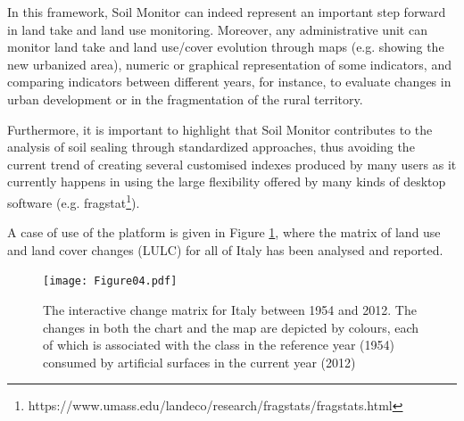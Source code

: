 \documentclass[APA,LATO1COL,doublespace]{WileyNJD-v2}
\begin{document}
In this framework, Soil Monitor can indeed represent an important step forward in land take and land use monitoring.
Moreover, any administrative unit can monitor land take and land use/cover evolution through maps (e.g. showing the new urbanized area), numeric or graphical representation of some indicators, and comparing indicators between different years, for instance, to evaluate changes in urban development or in the fragmentation of the rural territory.

Furthermore, it is important to highlight that Soil Monitor contributes to the analysis of soil sealing through standardized approaches, thus avoiding the current trend of creating several customised indexes produced by many users as it currently happens in using the large flexibility offered by many kinds of desktop software (e.g. fragstat\footnote{https://www.umass.edu/landeco/research/fragstats/fragstats.html}). 

A case of use of the platform is given in Figure \ref{fig:caseIT}, where the matrix of land use and land cover changes (LULC) for all of Italy has been analysed and reported. 

\begin{figure}[t] %
    \centerline{\texttt{[image: Figure04.pdf]}}
    \caption{ The interactive change matrix for Italy between 1954 and 2012.
    The changes in both the chart and the map are depicted by colours, each of which is associated with the class in the reference year (1954) consumed by artificial surfaces in the current year (2012) } \label{fig:caseIT}
\end{figure}
\end{document}
